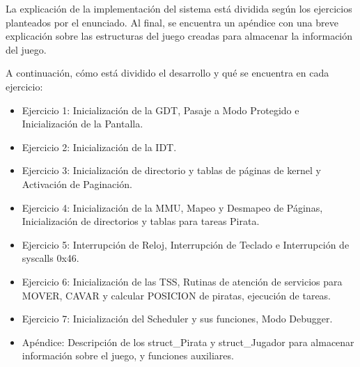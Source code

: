\par La explicación de la implementación del sistema está dividida según los ejercicios planteados por el enunciado. Al final, se encuentra un apéndice con una breve explicación sobre las estructuras del juego creadas para almacenar la información del juego.
\par A continuación, cómo está dividido el desarrollo y qué se encuentra en cada ejercicio:
\begin{itemize}
\item Ejercicio 1: Inicialización de la GDT, Pasaje a Modo Protegido e Inicialización de la Pantalla. 
\item Ejercicio 2: Inicialización de la IDT.
\item Ejercicio 3: Inicialización de directorio y tablas de páginas de kernel y Activación de Paginación. 
\item Ejercicio 4: Inicialización de la MMU, Mapeo y Desmapeo de Páginas, Inicialización de directorios y tablas para tareas Pirata.
\item Ejercicio 5: Interrupción de Reloj, Interrupción de Teclado e Interrupción de syscalls 0x46.
\item Ejercicio 6: Inicialización de las TSS, Rutinas de atención de servicios para MOVER, CAVAR y calcular POSICION de piratas, ejecución de tareas.
\item Ejercicio 7: Inicialización del Scheduler y sus funciones, Modo Debugger.
\item Apéndice: Descripción de los struct_Pirata y struct_Jugador para almacenar información sobre el juego, y funciones auxiliares.
\end{itemize}